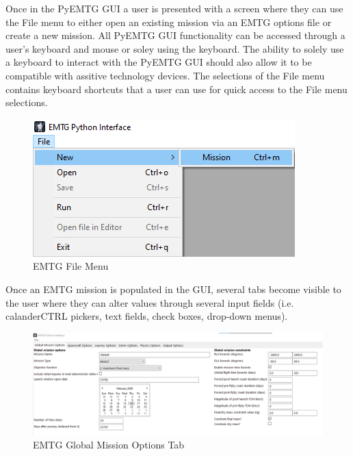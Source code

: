 
\noindent Once in the PyEMTG \ac{GUI} a user is presented with a screen where they can use the File menu to either open an existing mission via an \ac{EMTG} options file or create a new mission. All PyEMTG GUI functionality can be accessed through a user's keyboard and mouse or soley using the keyboard. The ability to solely use a keyboard to interact with the PyEMTG GUI should also allow it to be compatible with assitive technology devices. The selections of the File menu contains keyboard shortcuts that a user can use for quick access to the File menu selections. 

\begin{figure}[H]
	\centering
	\includegraphics[width=0.7\linewidth]{../../shared_latex_inputs/images/pyemtg_file_new.png}
	\caption{EMTG File Menu}
\end{figure}
				
\noindent Once an EMTG mission is populated in the GUI, several tabs become visible to the user where they can alter values through several input fields (i.e. calanderCTRL pickers, text fields, check boxes, drop-down menus). 

\begin{figure}[H]
	\centering
	\includegraphics[width=0.7\linewidth]{../../shared_latex_inputs/images/pyemtg_global_options_tab.png}
	\caption{EMTG Global Mission Options Tab}
\end{figure}

